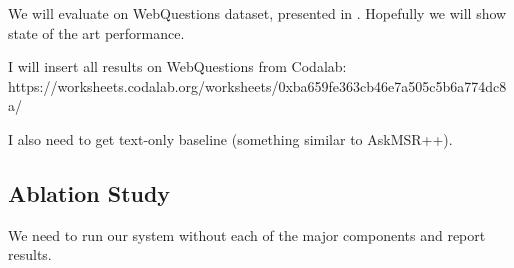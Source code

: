 
We will evaluate on WebQuestions dataset, presented in \cite{Berant:EMNLP13}.
Hopefully we will show state of the art performance.

I will insert all results on WebQuestions from Codalab: https://worksheets.codalab.org/worksheets/0xba659fe363cb46e7a505c5b6a774dc8a/


I also need to get text-only baseline (something similar to AskMSR++).

\subsection{Ablation Study}

We need to run our system without each of the major components and report results.

